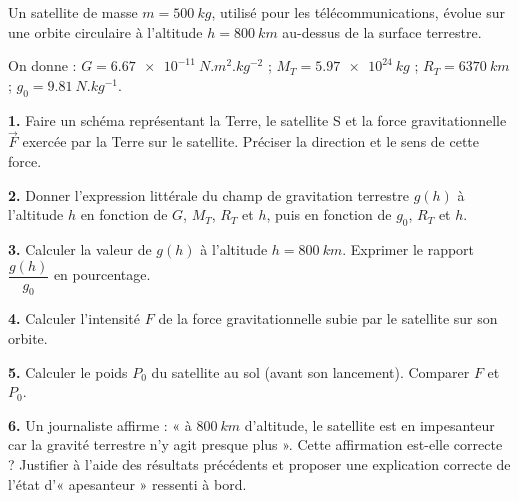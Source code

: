 \documentclass[11pt]{article}
\begin{document}
\begin{exercice}
Un satellite de masse $m = \SI{500}{kg}$, utilisé pour les télécommunications, évolue sur une orbite circulaire à l'altitude $h = \SI{800}{km}$ au-dessus de la surface terrestre.

On donne : $G = \SI{6,67e-11}{N.m^2.kg^{-2}}$ ; $M_T = \SI{5,97e24}{kg}$ ; $R_T = \SI{6370}{km}$ ; $g_0 = \SI{9,81}{N.kg^{-1}}$.

\textbf{1.} Faire un schéma représentant la Terre, le satellite S et la force gravitationnelle $\vec{F}$ exercée par la Terre sur le satellite. Préciser la direction et le sens de cette force.

\textbf{2.} Donner l'expression littérale du champ de gravitation terrestre $g(h)$ à l'altitude $h$ en fonction de $G$, $M_T$, $R_T$ et $h$, puis en fonction de $g_0$, $R_T$ et $h$.

\textbf{3.} Calculer la valeur de $g(h)$ à l'altitude $h = \SI{800}{km}$. Exprimer le rapport $\dfrac{g(h)}{g_0}$ en pourcentage.

\textbf{4.} Calculer l'intensité $F$ de la force gravitationnelle subie par le satellite sur son orbite.

\textbf{5.} Calculer le poids $P_0$ du satellite au sol (avant son lancement). Comparer $F$ et $P_0$.

\textbf{6.} Un journaliste affirme : « à $\SI{800}{km}$ d'altitude, le satellite est en impesanteur car la gravité terrestre n'y agit presque plus ». Cette affirmation est-elle correcte ? Justifier à l'aide des résultats précédents et proposer une explication correcte de l'état d'« apesanteur » ressenti à bord.
\end{exercice}
\end{document}
